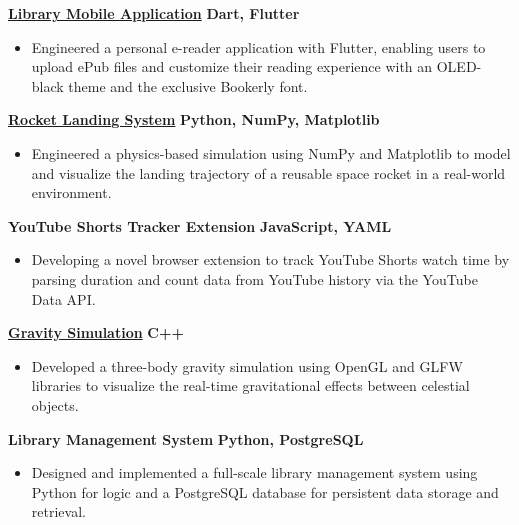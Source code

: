\documentclass[letterpaper,10pt]{article} %
\begin{document}
\textbf{\href{https://github.com/Ashwani564/My-Library}{Library Mobile Application}} \hfill \textbf{Dart, Flutter}
\begin{itemize}
    \item Engineered a personal e-reader application with Flutter, enabling users to upload ePub files and customize their reading experience with an OLED-black theme and the exclusive Bookerly font.
\end{itemize}

\textbf{\href{https://github.com/Ashwani564/rocket_landing_system}{Rocket Landing System}} \hfill \textbf{Python, NumPy, Matplotlib}
\begin{itemize}
    \item Engineered a physics-based simulation using NumPy and Matplotlib to model and visualize the landing trajectory of a reusable space rocket in a real-world environment. %
\end{itemize}

\textbf{YouTube Shorts Tracker Extension} \hfill \textbf{JavaScript, YAML}
\begin{itemize}
    \item Developing a novel browser extension to track YouTube Shorts watch time by parsing duration and count data from YouTube history via the YouTube Data API. %
\end{itemize}

\textbf{\href{https://github.com/Ashwani564/gravity_simulation}{Gravity Simulation}} \hfill \textbf{C++}
\begin{itemize}
    \item Developed a three-body gravity simulation using OpenGL and GLFW libraries to visualize the real-time gravitational effects between celestial objects. %
\end{itemize}

\textbf{Library Management System} \hfill \textbf{Python, PostgreSQL}
\begin{itemize}
    \item Designed and implemented a full-scale library management system using Python for logic and a PostgreSQL database for persistent data storage and retrieval. %
\end{itemize}
\end{document}
